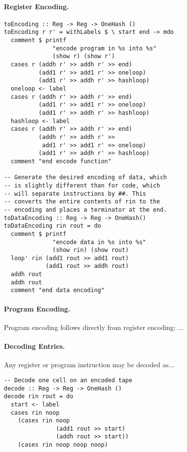\documentclass[10pt, preprint, nocopyrightspace]{sigplanconf}
\begin{document}
\paragraph{Register Encoding.}

\begin{lstlisting}
toEncoding :: Reg -> Reg -> OneHash ()
toEncoding r r' = withLabels $ \ start end -> mdo
  comment $ printf
              "encode program in %s into %s"
              (show r) (show r')
  cases r (addh r' >> addh r' >> end)
          (add1 r' >> add1 r' >> oneloop)
          (add1 r' >> addh r' >> hashloop)
  oneloop <- label
  cases r (addh r' >> addh r' >> end)
          (add1 r' >> add1 r' >> oneloop)
          (add1 r' >> addh r' >> hashloop)
  hashloop <- label
  cases r (addh r' >> addh r' >> end)
          (addh r' >> addh r' >>
           add1 r' >> add1 r' >> oneloop)
          (add1 r' >> addh r' >> hashloop)
  comment "end encode function"

-- Generate the desired encoding of data, which
-- is slightly different than for code, which
-- will separate instructions by ##. This
-- converts the entire contents of rin to the
-- encoding and places a terminator at the end.
toDataEncoding :: Reg -> Reg -> OneHash()
toDataEncoding rin rout = do
  comment $ printf
              "encode data in %s into %s"
              (show rin) (show rout)
  loop' rin (add1 rout >> add1 rout)
            (add1 rout >> addh rout)
  addh rout
  addh rout
  comment "end data encoding"
\end{lstlisting}

\paragraph{Program Encoding.}

Program encoding follows directly from register encoding: ...

\paragraph{Decoding Entries.}

Any register or program instruction may be decoded as...

\begin{lstlisting}
-- Decode one cell on an encoded tape
decode :: Reg -> Reg -> OneHash ()
decode rin rout = do
  start <- label
  cases rin noop
    (cases rin noop
               (add1 rout >> start)
               (addh rout >> start))
    (cases rin noop noop noop)
\end{lstlisting}
\end{document}
